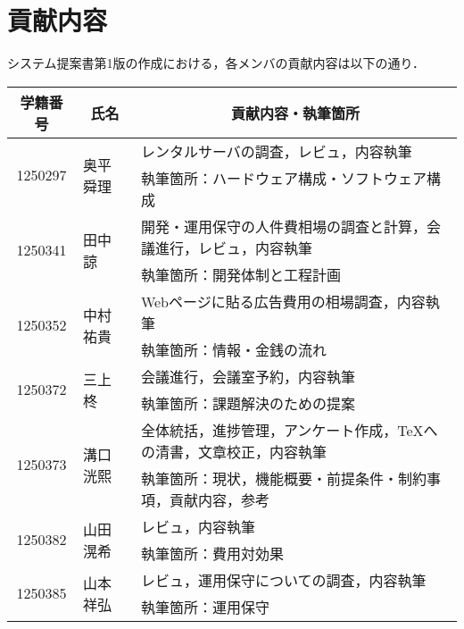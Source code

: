 \chapter{貢献内容}
システム提案書第1版の作成における，各メンバの貢献内容は以下の通り．
\begin{table}[h]
    \centering
    \begin{tabularx}{\textwidth}{cll}
        \multicolumn{1}{c}{学籍番号} & \multicolumn{1}{c}{氏名} & \multicolumn{1}{c}{貢献内容・執筆箇所}         \\
        \hline
        \multirow{2}{*}{1250297} & \multirow{2}{*}{奥平 舜理} & レンタルサーバの調査，レビュ，内容執筆                   \\
                                 &                        & 執筆箇所：ハードウェア構成・ソフトウェア構成                \\
        \hline
        \multirow{2}{*}{1250341} & \multirow{2}{*}{田中 諒}  & 開発・運用保守の人件費相場の調査と計算，会議進行，レビュ，内容執筆     \\
                                 &                        & 執筆箇所：開発体制と工程計画                        \\
        \hline
        \multirow{2}{*}{1250352} & \multirow{2}{*}{中村 祐貴} & Webページに貼る広告費用の相場調査，内容執筆               \\
                                 &                        & 執筆箇所：情報・金銭の流れ                         \\
        \hline
        \multirow{2}{*}{1250372} & \multirow{2}{*}{三上 柊}  & 会議進行，会議室予約，内容執筆                       \\
                                 &                        & 執筆箇所：課題解決のための提案                       \\
        \hline
        \multirow{2}{*}{1250373} & \multirow{2}{*}{溝口 洸熙} & 全体統括，進捗管理，アンケート作成，\TeX への清書，文章校正，内容執筆 \\
                                 &                        & 執筆箇所：現状，機能概要・前提条件・制約事項，貢献内容，参考        \\
        \hline
        \multirow{2}{*}{1250382} & \multirow{2}{*}{山田 滉希} & レビュ，内容執筆                              \\
                                 &                        & 執筆箇所：費用対効果                            \\
        \hline
        \multirow{2}{*}{1250385} & \multirow{2}{*}{山本 祥弘} & レビュ，運用保守についての調査，内容執筆                  \\
                                 &                        & 執筆箇所：運用保守                             \\
        \hline
    \end{tabularx}
\end{table}